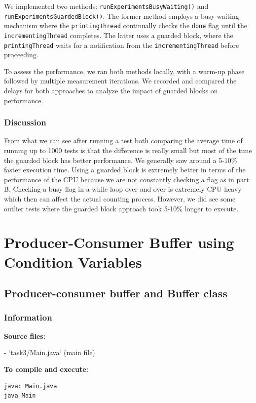 \documentclass{article}
\begin{document}
We implemented two methods: \texttt{runExperimentsBusyWaiting()} and \\ \texttt{runExperimentsGuardedBlock()}. The former method employs a busy-waiting mechanism where the \texttt{printingThread} continually checks the \texttt{done} flag until the \texttt{incrementingThread} completes. The latter uses a guarded block, where the \texttt{printingThread} waits for a notification from the \texttt{incrementingThread} before proceeding.

To assess the performance, we ran both methods locally, with a warm-up phase followed by multiple measurement iterations. We recorded and compared the delays for both approaches to analyze the impact of guarded blocks on performance.

\subsubsection{Discussion}
From what we can see after running a test both comparing the average time of running up to 1000 tests is that the difference is really small but most of the time the guarded block has better performance. We generally saw around a 5-10\% faster execution time. Using a guarded block is extremely better in terms of the performance of the CPU because we are not constantly checking a flag as in part B. Checking a busy flag in a while loop over and over is extremely CPU heavy which then can affect the actual counting process. However, we did see some outlier tests where the guarded block approach took 5-10\% longer to execute.




\newpage
\section{Producer-Consumer Buffer using Condition Variables}

\subsection{Producer-consumer buffer and Buffer class}

\subsubsection{Information}
\textbf{Source files:}

- `task3/Main.java` (main file)

\textbf{To compile and execute:}
\begin{lstlisting}[style=bash]
javac Main.java
java Main
\end{lstlisting}
\end{document}
